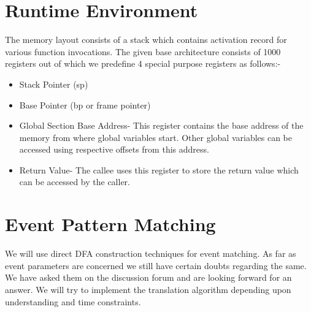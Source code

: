 \documentclass{sigchi}
\begin{document}
\section {Runtime Environment}
	The memory layout consists of a stack which contains activation record for various function invocations.
    The given base architecture consists of 1000 registers out of which we predefine 4 special purpose registers as follows:-
        \begin{itemize}
        \item Stack Pointer (sp)
        \item Base Pointer (bp or frame pointer)
        \item Global Section Base Address- This register contains the base address of the memory from where global variables start. Other global variables can be accessed using respective offsets from this address.
        \item Return Value- The callee uses this register to store the return value which can be accessed by the caller.
        \end{itemize}

\section {Event Pattern Matching}
We will use direct DFA construction techniques for event matching. As far as event parameters are concerned we still have certain doubts regarding the same.
We have asked them on the discussion forum and are looking forward for an answer.
We will try to implement the translation algorithm depending upon understanding and time constraints.
\end{document}
